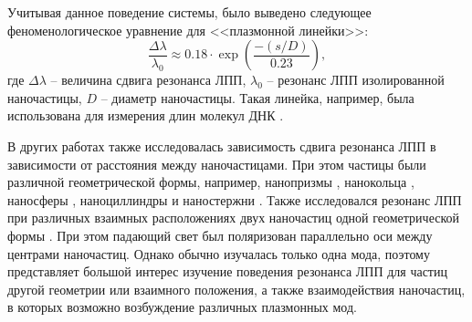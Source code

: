 Учитывая данное поведение системы, было выведено следующее феноменологическое уравнение для <<плазмонной линейки>>:
\begin{equation}
\frac{\Delta \lambda}{\lambda_0} \approx 0.18 \cdot \exp \left( \frac{-(s/D)}{0.23} \right),
\label{eq:plasmon_ruler}
\end{equation}
где $ \Delta \lambda $ -- величина сдвига резонанса ЛПП, $ \lambda_0 $ -- резонанс ЛПП изолированной наночастицы, $ D $ -- диаметр наночастицы. Такая линейка, например, была использована для измерения длин молекул ДНК \cite{bioplasmonruler3}.

В других работах также исследовалась зависимость сдвига резонанса ЛПП в зависимости от расстояния между наночастицами. При этом частицы были различной геометрической формы, например, нанопризмы \cite{nanoprism, nanoshells}, нанокольца \cite{nanoring}, наносферы \cite{nanospheres, nanospheres2}, наноциллиндры \cite{nanocyllinders} и наностержни \cite{nanorods}. Также исследовался резонанс ЛПП при различных взаимных расположениях двух наночастиц одной геометрической формы \cite{nanorods2, nanorods3, 3druler}. При этом падающий свет был поляризован параллельно оси между центрами наночастиц. Однако обычно изучалась только одна мода, поэтому представляет большой интерес изучение поведения резонанса ЛПП для частиц другой геометрии или взаимного положения, а также взаимодействия наночастиц, в которых возможно возбуждение различных плазмонных мод.